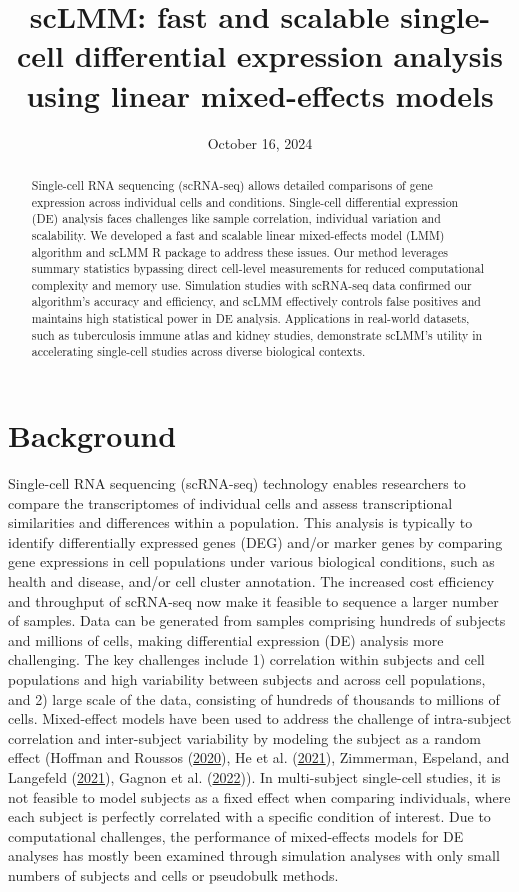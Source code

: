 \documentclass[
]{article}
\title{scLMM: fast and scalable single-cell differential expression
analysis using linear mixed-effects models}
\author{}
\date{\vspace{-2.5em}October 16, 2024}
\begin{document}
\maketitle
\begin{abstract}
Single-cell RNA sequencing (scRNA-seq) allows detailed comparisons of
gene expression across individual cells and conditions. Single-cell
differential expression (DE) analysis faces challenges like sample
correlation, individual variation and scalability. We developed a fast
and scalable linear mixed-effects model (LMM) algorithm and scLMM R
package to address these issues. Our method leverages summary statistics
bypassing direct cell-level measurements for reduced computational
complexity and memory use. Simulation studies with scRNA-seq data
confirmed our algorithm's accuracy and efficiency, and scLMM effectively
controls false positives and maintains high statistical power in DE
analysis. Applications in real-world datasets, such as tuberculosis
immune atlas and kidney studies, demonstrate scLMM's utility in
accelerating single-cell studies across diverse biological contexts.
\end{abstract}

\hypertarget{background}{%
\section{Background}\label{background}}

Single-cell RNA sequencing (scRNA-seq) technology enables researchers to
compare the transcriptomes of individual cells and assess
transcriptional similarities and differences within a population. This
analysis is typically to identify differentially expressed genes (DEG)
and/or marker genes by comparing gene expressions in cell populations
under various biological conditions, such as health and disease, and/or
cell cluster annotation. The increased cost efficiency and throughput of
scRNA-seq now make it feasible to sequence a larger number of samples.
Data can be generated from samples comprising hundreds of subjects and
millions of cells, making differential expression (DE) analysis more
challenging. The key challenges include 1) correlation within subjects
and cell populations and high variability between subjects and across
cell populations, and 2) large scale of the data, consisting of hundreds
of thousands to millions of cells. Mixed-effect models have been used to
address the challenge of intra-subject correlation and inter-subject
variability by modeling the subject as a random effect (Hoffman and
Roussos (\protect\hyperlink{ref-Dream2020}{2020}), He et al.
(\protect\hyperlink{ref-nebula}{2021}), Zimmerman, Espeland, and
Langefeld (\protect\hyperlink{ref-Zimmerman2021}{2021}), Gagnon et al.
(\protect\hyperlink{ref-MSMCSim2022}{2022})). In multi-subject
single-cell studies, it is not feasible to model subjects as a fixed
effect when comparing individuals, where each subject is perfectly
correlated with a specific condition of interest. Due to computational
challenges, the performance of mixed-effects models for DE analyses has
mostly been examined through simulation analyses with only small numbers
of subjects and cells or pseudobulk methods.
\end{document}
